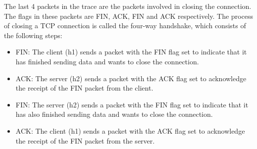 The last 4 packets in the trace are the packets involved in closing the connection. The flags in these packets are FIN, ACK, FIN and ACK respectively. 
The process of closing a TCP connection is called the four-way handshake, which consists of the following steps:
\begin{itemize}
    \item FIN: The client (h1) sends a packet with the FIN flag set to indicate that it has finished sending data and wants to close the connection.
    \item ACK: The server (h2) sends a packet with the ACK flag set to acknowledge the receipt of the FIN packet from the client.
    \item FIN: The server (h2) sends a packet with the FIN flag set to indicate that it has also finished sending data and wants to close the connection.
    \item ACK: The client (h1) sends a packet with the ACK flag set to acknowledge the receipt of the FIN packet from the server.
\end{itemize}

